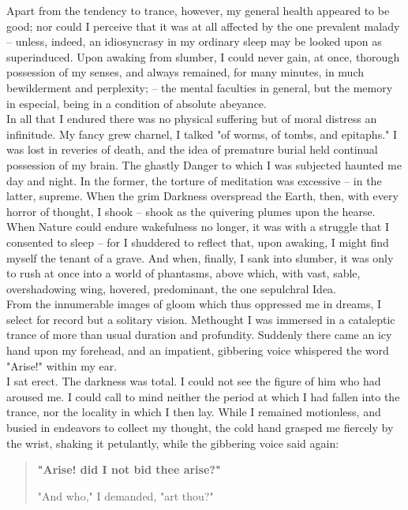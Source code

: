 \documentclass[12pt,a4paper]{article}
\begin{document}
Apart from the tendency to trance, however, my general health appeared to be good; nor could I perceive that it was at all affected by the one prevalent malady -- unless, indeed, an idiosyncrasy in my ordinary sleep may be looked upon as superinduced. Upon awaking from slumber, I could never gain, at once, thorough possession of my senses, and always remained, for many minutes, in much bewilderment and perplexity; -- the mental faculties in general, but the memory in especial, being in a condition of absolute abeyance. \\

In all that I endured there was no physical suffering but of moral distress an infinitude. My fancy grew charnel, I talked "of worms, of tombs, and epitaphs." I was lost in reveries of death, and the idea of premature burial held continual possession of my brain. The ghastly Danger to which I was subjected haunted me day and night. In the former, the torture of meditation was excessive -- in the latter, supreme. When the grim Darkness overspread the Earth, then, with every horror of thought, I shook -- shook as the quivering plumes upon the hearse. When Nature could endure wakefulness no longer, it was with a struggle that I consented to sleep -- for I shuddered to reflect that, upon awaking, I might find myself the tenant of a grave. And when, finally, I sank into slumber, it was only to rush at once into a world of phantasms, above which, with vast, sable, overshadowing wing, hovered, predominant, the one sepulchral Idea. \\

From the innumerable images of gloom which thus oppressed me in dreams, I select for record but a solitary vision. Methought I was immersed in a cataleptic trance of more than usual duration and profundity. Suddenly there came an icy hand upon my forehead, and an impatient, gibbering voice whispered the word "Arise!" within my ear. \\

I sat erect. The darkness was total. I could not see the figure of him who had aroused me. I could call to mind neither the period at which I had fallen into the trance, nor the locality in which I then lay. While I remained motionless, and busied in endeavors to collect my thought, the cold hand grasped me fiercely by the wrist, shaking it petulantly, while the gibbering voice said again:

\begin{quotation}
\bf
"Arise! did I not bid thee arise?"

"And who," I demanded, "art thou?"

\end{quotation}
\end{document}
